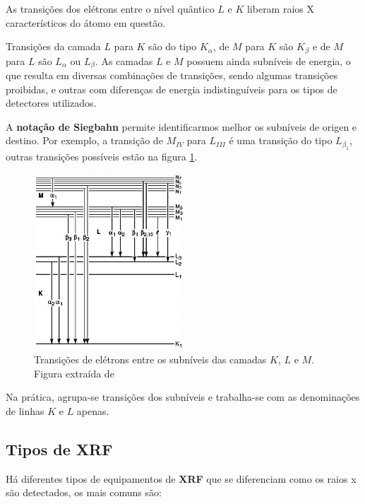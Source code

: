 As transições dos elétrons entre o nível quântico $L$ e
$K$ liberam raios X característicos do átomo em questão. 

Transições da camada $L$ para $K$ são do tipo $K_{\alpha}$, de $M$ para $K$ 
são $K_{\beta}$ e de $M$ para $L$ são $L_{\alpha}$ ou $L_{\beta}$. 
As camadas $L$ e $M$ possuem ainda subníveis de energia, o que resulta em diversas
combinações de transições, sendo algumas transições proibidas, e outras 
com diferenças de energia indistinguíveis para os tipos de 
detectores utilizados.

A \textbf{notação de Siegbahn} \citep{jenkins1991} permite identificarmos 
melhor os subníveis de origen e destino. 
Por exemplo, a transição de $M_{IV}$ para $L_{III}$ é uma transição do 
tipo $L_{\beta_1}$, outras transições possíveis estão na figura \ref{fig:siegbahn}. 

\begin{figure}[H]
\begin{center} 
  \includegraphics[width=0.5\textwidth]{../inputs/images/Siegbahn.jpg}
  \caption{Transições de elétrons entre os subníveis das camadas $K$, $L$ e $M$. 
           Figura extraída de \citep{jenkins1991} \label{fig:siegbahn}}
\end{center}
\end{figure}

Na prática, agrupa-se transições dos subníveis e trabalha-se com 
as denominações de linhas $K$ e $L$ apenas. 

\subsection{Tipos de \textbf{XRF}}

Há diferentes tipos de equipamentos de \textbf{XRF} que se diferenciam 
como os raios x são detectados, os mais comuns são:

